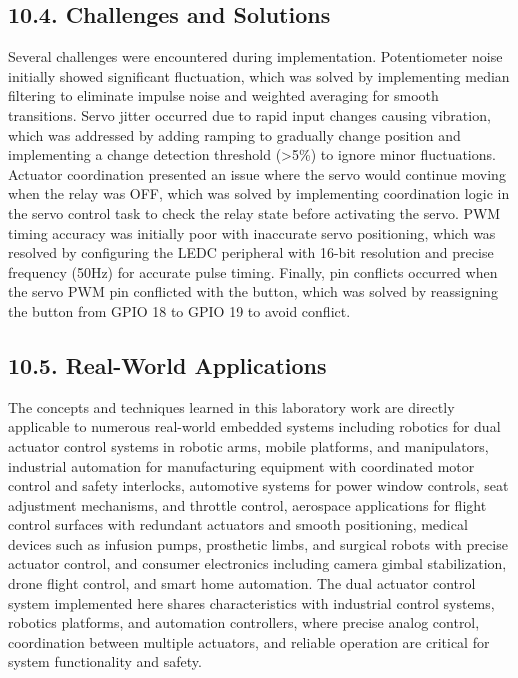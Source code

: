 \documentclass[12pt]{article}
\begin{document}
\subsection*{10.4. Challenges and Solutions}

Several challenges were encountered during implementation. Potentiometer noise initially showed significant fluctuation, which was solved by implementing median filtering to eliminate impulse noise and weighted averaging for smooth transitions. Servo jitter occurred due to rapid input changes causing vibration, which was addressed by adding ramping to gradually change position and implementing a change detection threshold (>5\%) to ignore minor fluctuations. Actuator coordination presented an issue where the servo would continue moving when the relay was OFF, which was solved by implementing coordination logic in the servo control task to check the relay state before activating the servo. PWM timing accuracy was initially poor with inaccurate servo positioning, which was resolved by configuring the LEDC peripheral with 16-bit resolution and precise frequency (50Hz) for accurate pulse timing. Finally, pin conflicts occurred when the servo PWM pin conflicted with the button, which was solved by reassigning the button from GPIO 18 to GPIO 19 to avoid conflict.

\subsection*{10.5. Real-World Applications}

The concepts and techniques learned in this laboratory work are directly applicable to numerous real-world embedded systems including robotics for dual actuator control systems in robotic arms, mobile platforms, and manipulators, industrial automation for manufacturing equipment with coordinated motor control and safety interlocks, automotive systems for power window controls, seat adjustment mechanisms, and throttle control, aerospace applications for flight control surfaces with redundant actuators and smooth positioning, medical devices such as infusion pumps, prosthetic limbs, and surgical robots with precise actuator control, and consumer electronics including camera gimbal stabilization, drone flight control, and smart home automation. The dual actuator control system implemented here shares characteristics with industrial control systems, robotics platforms, and automation controllers, where precise analog control, coordination between multiple actuators, and reliable operation are critical for system functionality and safety.
\end{document}
